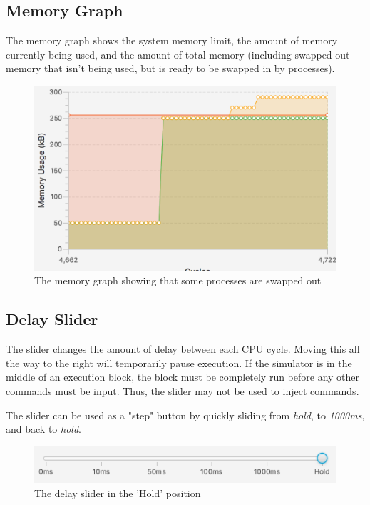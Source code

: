 \documentclass[paper=a4, fontsize=11pt]{scrartcl} %
\numberwithin{equation}{section} %
\numberwithin{figure}{section} %
\numberwithin{table}{section} %
\begin{document}
\subsection{Memory Graph}
The memory graph shows the system memory limit, the amount of memory currently being used, and the amount of total memory (including swapped out memory that isn't being used, but is ready to be swapped in by processes).
\begin{figure}[H]
  \centering
    \includegraphics[scale=.5]{MemoryGraph.png}
  \caption{The memory graph showing that some processes are swapped out}
\end{figure}

\subsection{Delay Slider}
The slider changes the amount of delay between each CPU cycle. Moving this all the way to the right will temporarily pause execution. If the simulator is in the middle of an execution block, the block must be completely run before any other commands must be input. Thus, the slider may not be used to inject commands.

The slider can be used as a "step" button by quickly sliding from \textit{hold}, to \textit{1000ms}, and back to \textit{hold}.
\begin{figure}[H]
  \centering
    \includegraphics[scale=.5]{DelaySlider.png}
  \caption{The delay slider in the 'Hold' position}
\end{figure}
\end{document}
